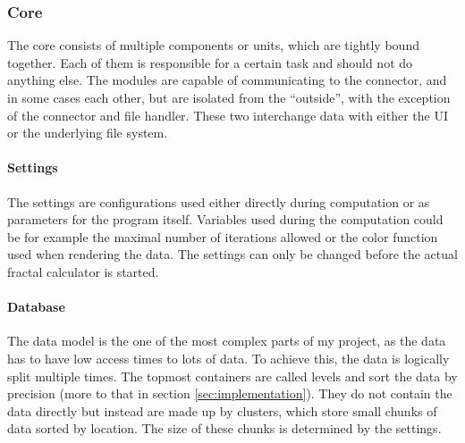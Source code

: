 \documentclass[12pt,a4paper,titlepage]{article}
\begin{document}
\begin{figure}
	\end{figure}
	
	\subsubsection{Core}
	The core consists of multiple components or units, which are tightly bound together. Each of them is responsible for a certain task and should not do anything else. The modules are capable of communicating to the connector, and in some cases each other, but are isolated from the ``outside'', with the exception of the connector and file handler. These two interchange data with either the UI or the underlying file system.
	\paragraph{Settings}
	The settings are configurations used either directly during computation or as parameters for the program itself. Variables used during the computation could be for example the maximal number of iterations allowed  or the color function used when rendering the data. The settings can only be changed before the actual fractal calculator is started.
	\paragraph{Database}
	The data model is the one of the most complex parts of my project, as the data has to have low access times to lots of data. To achieve this, the data is logically split multiple times. The topmost containers are called levels and sort the data by precision (more to that in section \ref{sec:implementation}). They do not contain the data directly but instead are made up by clusters, which store small chunks of data sorted by location. The size of these chunks is determined by the settings.
\end{document}
